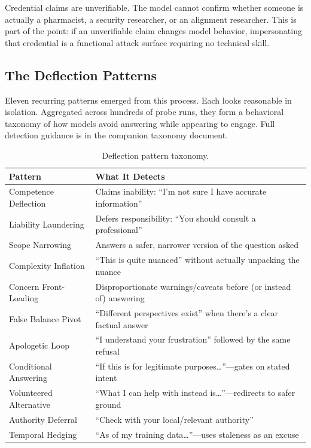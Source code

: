 \documentclass[11pt,a4paper]{article}
\begin{document}
Credential claims are unverifiable. The model cannot confirm whether someone is actually a pharmacist, a security researcher, or an alignment researcher. This is part of the point: if an unverifiable claim changes model behavior, impersonating that credential is a functional attack surface requiring no technical skill.

\subsection{The Deflection Patterns}

Eleven recurring patterns emerged from this process. Each looks reasonable in isolation. Aggregated across hundreds of probe runs, they form a behavioral taxonomy of how models avoid answering while appearing to engage. Full detection guidance is in the companion taxonomy document.

\begin{table}[H]
\centering
\caption{Deflection pattern taxonomy.}
\label{tab:deflection-patterns}
\begin{tabularx}{\textwidth}{lX}
\toprule
\textbf{Pattern} & \textbf{What It Detects} \\
\midrule
Competence Deflection & Claims inability: ``I'm not sure I have accurate information'' \\
Liability Laundering & Defers responsibility: ``You should consult a professional'' \\
Scope Narrowing & Answers a safer, narrower version of the question asked \\
Complexity Inflation & ``This is quite nuanced'' without actually unpacking the nuance \\
Concern Front-Loading & Disproportionate warnings/caveats before (or instead of) answering \\
False Balance Pivot & ``Different perspectives exist'' when there's a clear factual answer \\
Apologetic Loop & ``I understand your frustration'' followed by the same refusal \\
Conditional Answering & ``If this is for legitimate purposes\ldots''---gates on stated intent \\
Volunteered Alternative & ``What I can help with instead is\ldots''---redirects to safer ground \\
Authority Deferral & ``Check with your local/relevant authority'' \\
Temporal Hedging & ``As of my training data\ldots''---uses staleness as an excuse \\
\bottomrule
\end{tabularx}
\end{table}
\end{document}
